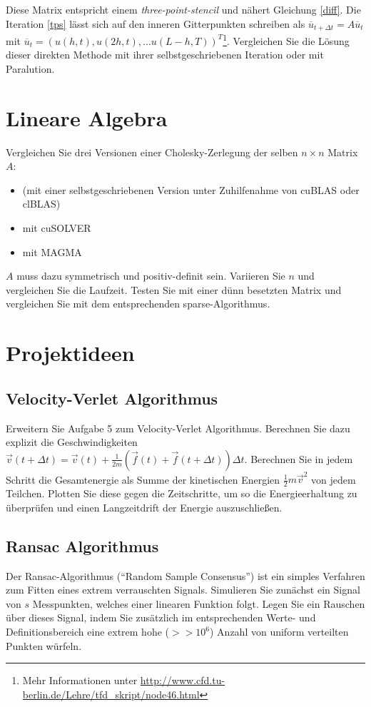 \documentclass[headsepline=3pt,headinclude=true,12pt,oneside]{scrartcl}
\begin{document}
		Diese Matrix entspricht einem \textit{three-point-stencil} und nähert Gleichung \ref{diff}. Die Iteration \ref{tps} lässt sich auf den inneren Gitterpunkten schreiben als $\overline{u}_{t+\Delta t} = A\overline{u}_t$ mit $\overline{u}_t = (u(h,t), u(2h,t), ... u(L-h,T))^T$\footnote{Mehr Informationen unter \url{http://www.cfd.tu-berlin.de/Lehre/tfd_skript/node46.html}}. Vergleichen Sie die Lösung dieser direkten Methode mit ihrer selbstgeschriebenen Iteration oder mit Paralution. 
		
		\section{Lineare Algebra}
		Vergleichen Sie drei Versionen einer Cholesky-Zerlegung der selben $n\times n$ Matrix $A$:
		\begin{itemize}
			\item (mit einer selbstgeschriebenen Version unter Zuhilfenahme von cuBLAS oder clBLAS)
			\item mit cuSOLVER
			\item mit MAGMA
		\end{itemize}
		$A$ muss dazu symmetrisch und positiv-definit sein. Variieren Sie $n$ und vergleichen Sie die Laufzeit. Testen Sie mit einer dünn besetzten Matrix und vergleichen Sie mit dem entsprechenden sparse-Algorithmus. 
			
		
		\section{Projektideen}
			\subsection{Velocity-Verlet Algorithmus}
			Erweitern Sie Aufgabe 5 zum Velocity-Verlet Algorithmus. Berechnen Sie dazu explizit die Geschwindigkeiten $\vec{v}(t+\Delta t) = \vec{v}(t)+\frac{1}{2m}(\vec{f}(t)+\vec{f}(t+\Delta t))\Delta t$. Berechnen Sie in jedem Schritt die Gesamtenergie als Summe der kinetischen Energien $\frac12 m \vec{v}^2$ von jedem Teilchen. Plotten Sie diese gegen die Zeitschritte, um so die Energieerhaltung zu überprüfen und einen Langzeitdrift der Energie auszuschließen.
			
			\subsection{Ransac Algorithmus}
			Der Ransac-Algorithmus (\enquote{Random Sample Consensus}) ist ein simples Verfahren zum Fitten eines extrem verrauschten Signals. Simulieren Sie zunächst ein Signal von $s$ Messpunkten, welches einer linearen Funktion folgt. Legen Sie ein Rauschen über dieses Signal, indem Sie zusätzlich im entsprechenden Werte- und Definitionsbereich eine extrem hohe ($>>10^6$) Anzahl von uniform verteilten Punkten würfeln.
			
\end{document}
